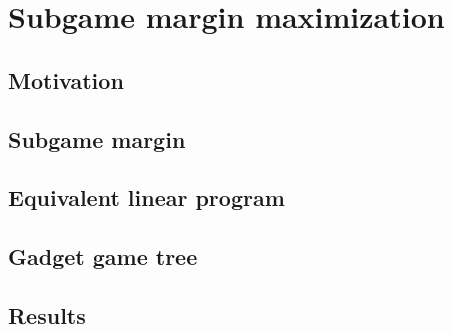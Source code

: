 \chapter{Subgame margin maximization}

\section{Motivation}

\section{Subgame margin}

\section{Equivalent linear program}

\section{Gadget game tree}

\section{Results}
